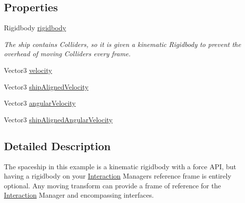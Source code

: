 \subsection*{Properties}
\begin{DoxyCompactItemize}
\item 
Rigidbody \mbox{\hyperlink{class_leap_1_1_unity_1_1_examples_1_1_spaceship_a1e2feb769d40fe69ee816294bea0c326}{rigidbody}}
\begin{DoxyCompactList}\small\item\em The ship contains Colliders, so it is given a kinematic Rigidbody to prevent the overhead of moving Colliders every frame. \end{DoxyCompactList}\item 
Vector3 \mbox{\hyperlink{class_leap_1_1_unity_1_1_examples_1_1_spaceship_a85db85a569f39191c86b6d13e64a5d72}{velocity}}
\item 
Vector3 \mbox{\hyperlink{class_leap_1_1_unity_1_1_examples_1_1_spaceship_ae135263bab134965e23c622b8be345ce}{ship\+Aligned\+Velocity}}
\item 
Vector3 \mbox{\hyperlink{class_leap_1_1_unity_1_1_examples_1_1_spaceship_a8cf051cbc8502f4407e535a944640ca2}{angular\+Velocity}}
\item 
Vector3 \mbox{\hyperlink{class_leap_1_1_unity_1_1_examples_1_1_spaceship_a93b58eabd1710a71b7a087e274b9fa8c}{ship\+Aligned\+Angular\+Velocity}}
\end{DoxyCompactItemize}


\subsection{Detailed Description}
The spaceship in this example is a kinematic rigidbody with a force A\+PI, but having a rigidbody on your \mbox{\hyperlink{namespace_leap_1_1_unity_1_1_interaction}{Interaction}} Manager\textquotesingle{}s reference frame is entirely optional. Any moving transform can provide a frame of reference for the \mbox{\hyperlink{namespace_leap_1_1_unity_1_1_interaction}{Interaction}} Manager and encompassing interfaces. 

